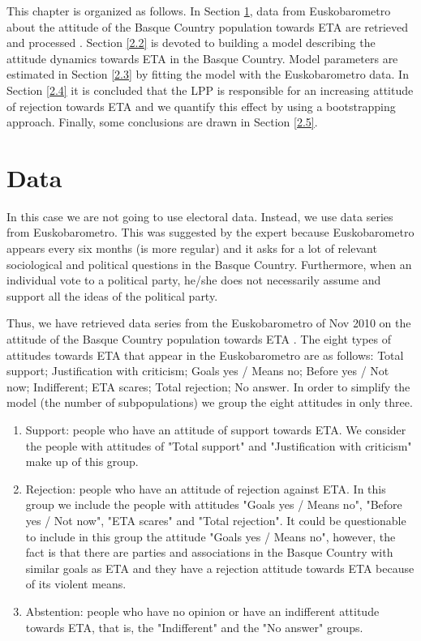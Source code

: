 This chapter is organized as follows. In Section \ref{2.1}, data from Euskobarometro about the attitude of the Basque Country population towards ETA are retrieved and processed \cite[Table 20]{eusko}. Section \ref{2.2} is devoted to building a model describing the attitude dynamics towards ETA in the Basque Country. Model parameters are estimated in Section \ref{2.3} by fitting the model with the Euskobarometro data. In Section \ref{2.4} it is concluded that the LPP is responsible for an increasing attitude of rejection towards ETA and we quantify this effect by using a bootstrapping approach. Finally, some conclusions are drawn in Section \ref{2.5}.

\section{Data}\label{2.1}
In this case we are not going to use electoral data. Instead, we use data series from Euskobarometro. This was suggested by the expert because Euskobarometro appears every six months (is more regular) and it asks for a lot of relevant sociological and political questions in the Basque Country. Furthermore, when an individual vote to a political party, he/she does not necessarily assume and support all the ideas of the political party.
 
Thus, we have retrieved data series from the Euskobarometro of Nov 2010 on the attitude of the Basque Country population towards ETA \cite[Table 20]{eusko}. The eight types of attitudes towards ETA that appear in the Euskobarometro are as follows: Total support; Justification with criticism; Goals yes / Means no; Before yes / Not now; Indifferent; ETA scares; Total rejection; No answer. In order to simplify the model (the number of subpopulations) we group the eight attitudes in only three.

\begin{enumerate}
\item Support: people who have an attitude of support towards ETA. We consider the people with attitudes of "Total support" and "Justification with criticism" make up of this group.
\item Rejection: people who have an attitude of rejection against ETA. In this group we include the people with attitudes "Goals yes / Means no", "Before yes / Not now", "ETA scares" and "Total rejection". It could be questionable to include in this group the attitude "Goals yes / Means no", however, the fact is that there are parties and associations in the Basque Country with similar goals as ETA  and they have a rejection attitude towards ETA because of its violent means. 
\item Abstention: people who have no opinion or have an indifferent attitude towards ETA, that is, the "Indifferent" and the "No answer" groups.
\end{enumerate}

